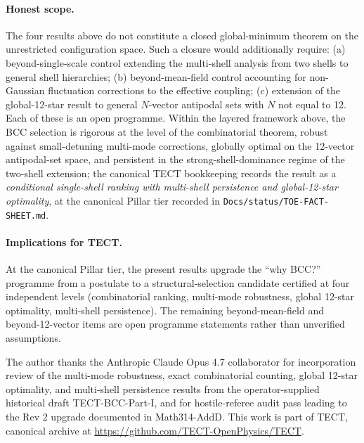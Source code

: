 \paragraph{Honest scope.}
The four results above do not constitute a closed global-minimum
theorem on the unrestricted configuration space. Such a closure would
additionally require: (a) beyond-single-scale control extending the
multi-shell analysis from two shells to general shell hierarchies;
(b) beyond-mean-field control accounting for non-Gaussian fluctuation
corrections to the effective coupling; (c) extension of the
global-12-star result to general $N$-vector antipodal sets with $N$
not equal to 12. Each of these is an open programme. Within the
layered framework above, the BCC selection is rigorous at the level
of the combinatorial theorem, robust against small-detuning
multi-mode corrections, globally optimal on the 12-vector
antipodal-set space, and persistent in the strong-shell-dominance
regime of the two-shell extension; the canonical TECT bookkeeping
records the result as a \emph{conditional single-shell ranking with
multi-shell persistence and global-12-star optimality}, at the
canonical Pillar tier recorded in
\texttt{Docs/status/TOE-FACT-SHEET.md}.

\paragraph{Implications for TECT.}
At the canonical Pillar tier, the present results upgrade the
``why BCC?'' programme from a postulate to a structural-selection
candidate certified at four independent levels (combinatorial
ranking, multi-mode robustness, global 12-star optimality,
multi-shell persistence). The remaining beyond-mean-field and
beyond-12-vector items are open programme statements rather than
unverified assumptions.

\begin{acknowledgments}
The author thanks the Anthropic Claude Opus 4.7 collaborator for
incorporation review of the multi-mode robustness, exact combinatorial
counting, global 12-star optimality, and multi-shell persistence
results from the operator-supplied historical draft TECT-BCC-Part-I,
and for hostile-referee audit pass leading to the Rev 2 upgrade
documented in Math314-AddD. This work is part of TECT, canonical
archive at \url{https://github.com/TECT-OpenPhysics/TECT}.
\end{acknowledgments}

